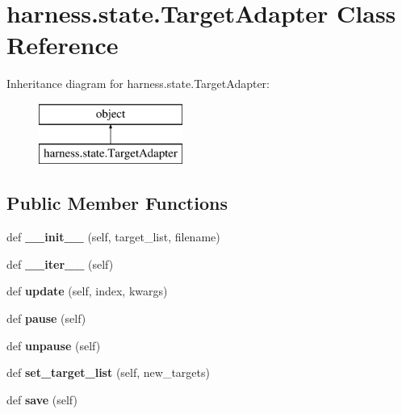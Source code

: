 \hypertarget{classharness_1_1state_1_1_target_adapter}{}\section{harness.\+state.\+Target\+Adapter Class Reference}
\label{classharness_1_1state_1_1_target_adapter}
Inheritance diagram for harness.\+state.\+Target\+Adapter\+:\begin{figure}[H]
\begin{center}
\leavevmode
\includegraphics[height=2.000000cm]{dd/daa/classharness_1_1state_1_1_target_adapter}
\end{center}
\end{figure}
\subsection*{Public Member Functions}
\begin{DoxyCompactItemize}
\item 
\mbox{\label{classharness_1_1state_1_1_target_adapter_af5e8f743e485546b61186c9a251d5425}} 
def {\bfseries \+\_\+\+\_\+init\+\_\+\+\_\+} (self, target\+\_\+list, filename)
\item 
\mbox{\label{classharness_1_1state_1_1_target_adapter_a4381ae7f1578316cc6478f32cbfe80b7}} 
def {\bfseries \+\_\+\+\_\+iter\+\_\+\+\_\+} (self)
\item 
\mbox{\label{classharness_1_1state_1_1_target_adapter_a7d21706fc0865f517c95d5ddac062585}} 
def {\bfseries update} (self, index, kwargs)
\item 
\mbox{\label{classharness_1_1state_1_1_target_adapter_a391e8deafc729501196cf01b0a7967bd}} 
def {\bfseries pause} (self)
\item 
\mbox{\label{classharness_1_1state_1_1_target_adapter_ad382a4da53d98f15d39d6efffe8f5d0b}} 
def {\bfseries unpause} (self)
\item 
\mbox{\label{classharness_1_1state_1_1_target_adapter_a9b1ff84ce21efce430b8098aa023e967}} 
def {\bfseries set\+\_\+target\+\_\+list} (self, new\+\_\+targets)
\item 
\mbox{\label{classharness_1_1state_1_1_target_adapter_a5ea7e35b3fab0e898bcef89788cffa13}} 
def {\bfseries save} (self)
\end{DoxyCompactItemize}
